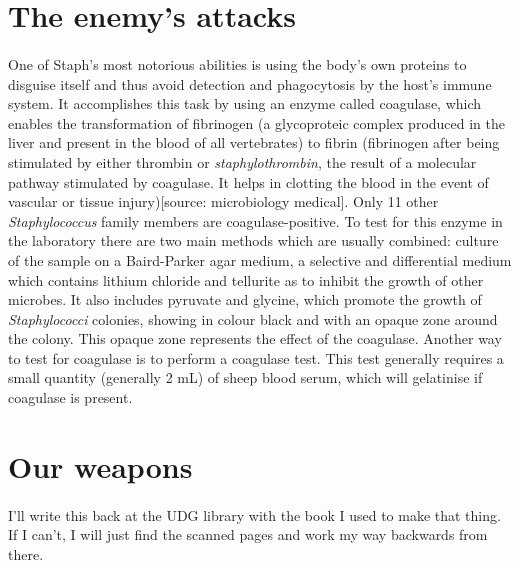 \section{The enemy's attacks}
\paragraph{}One of Staph's most notorious abilities is using the body's own proteins to disguise itself and thus avoid detection and phagocytosis by the host's immune system. It accomplishes this task by using an enzyme called coagulase, which enables the transformation of fibrinogen (a glycoproteic complex produced in the liver and present in the blood of all vertebrates) to fibrin (fibrinogen after being stimulated by either thrombin or \emph{staphylothrombin}, the result of a molecular pathway stimulated by coagulase. It helps in clotting the blood in the event of vascular or tissue injury)[source: microbiology medical]. Only 11 other \emph{Staphylococcus} family members are coagulase-positive. To test for this enzyme in the laboratory there are two main methods which are usually combined: culture of the sample on a Baird-Parker agar medium, a selective and differential medium which contains lithium chloride and tellurite as to inhibit the growth of other microbes. It also includes pyruvate and glycine, which promote the growth of \emph{Staphylococci} colonies, showing in colour black and with an opaque zone around the colony. This opaque zone represents the effect of the coagulase. Another way to test for coagulase is to perform a coagulase test. This test generally requires a small quantity (generally 2 mL) of sheep blood serum, which will gelatinise if coagulase is present.
\paragraph{}
\section{Our weapons}
\paragraph{}I'll write this back at the UDG library with the book  I used to make that thing. If I can't, I will just find the scanned pages and work my way backwards from there.
